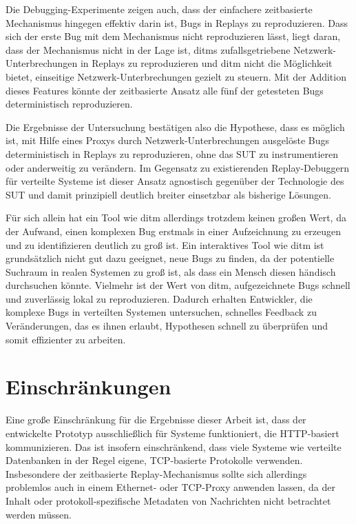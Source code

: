 \documentclass[12pt,a4paper]{report}
\begin{document}
Die Debugging-Experimente zeigen auch, dass der einfachere zeitbasierte Mechanismus hingegen effektiv darin ist, Bugs in Replays
zu reproduzieren. Dass sich der erste Bug mit dem Mechanismus nicht reproduzieren lässt, liegt daran, dass der Mechanismus nicht in der
Lage ist, ditms zufallsgetriebene Netzwerk-Unterbrechungen in Replays zu reproduzieren und ditm nicht die Möglichkeit bietet,
einseitige Netzwerk-Unterbrechungen gezielt zu steuern. Mit der Addition dieses Features könnte der zeitbasierte Ansatz alle fünf der
getesteten Bugs deterministisch reproduzieren.

Die Ergebnisse der Untersuchung bestätigen also die Hypothese, dass es möglich ist, mit Hilfe eines Proxys durch
Netzwerk-Unterbrechungen ausgelöste Bugs deterministisch in Replays zu reproduzieren, ohne das SUT zu instrumentieren oder
anderweitig zu verändern. Im Gegensatz zu existierenden Replay-Debuggern für verteilte Systeme ist dieser Ansatz agnostisch
gegenüber der Technologie des SUT und damit prinzipiell deutlich breiter einsetzbar als bisherige Lösungen.

Für sich allein hat ein Tool wie ditm allerdings trotzdem keinen großen Wert, da der Aufwand, einen komplexen Bug erstmals in
einer Aufzeichnung zu erzeugen und zu identifizieren deutlich zu groß ist. Ein interaktives Tool wie ditm ist grundsätzlich
nicht gut dazu geeignet, neue Bugs zu finden, da der potentielle Suchraum in realen Systemen zu groß ist, als dass ein Mensch
diesen händisch durchsuchen könnte. Vielmehr ist der Wert von ditm, aufgezeichnete Bugs schnell und zuverlässig lokal zu
reproduzieren. Dadurch erhalten Entwickler, die komplexe Bugs in verteilten Systemen untersuchen, schnelles Feedback zu
Veränderungen, das es ihnen erlaubt, Hypothesen schnell zu überprüfen und somit effizienter zu arbeiten.

\section{Einschränkungen}
Eine große Einschränkung für die Ergebnisse dieser Arbeit ist, dass der entwickelte Prototyp ausschließlich für Systeme
funktioniert, die HTTP-basiert kommunizieren. Das ist insofern einschränkend, dass viele Systeme wie verteilte Datenbanken in der
Regel eigene, TCP-basierte Protokolle verwenden. Insbesondere der zeitbasierte Replay-Mechanismus sollte sich allerdings
problemlos auch in einem Ethernet- oder TCP-Proxy anwenden lassen, da der Inhalt oder protokoll-spezifische Metadaten von
Nachrichten nicht betrachtet werden müssen.
\end{document}
